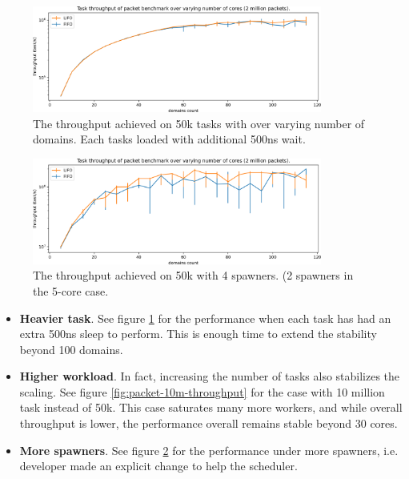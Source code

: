 \documentclass[12pt,a4paper,twoside]{report}
\begin{document}
\begin{figure} 
     \centering
     \includegraphics[width=0.85\textwidth]{eval/packet-basic-slowed_2.png}
     \caption{The throughput achieved on 50k tasks with over varying number of domains. Each tasks loaded with additional 500ns wait.}
    \label{fig:packet-slowed}
\end{figure}


\begin{figure} 
     \centering 
     \includegraphics[width=0.85\textwidth]{eval/packet-basic-4spawners-just-throughput.png}
     \caption{The throughput achieved on 50k with 4 spawners. (2 spawners in the 5-core case.}
    \label{fig:packet-4spawners}
\end{figure}

\begin{itemize}
    \item \textbf{Heavier task}. See figure \ref{fig:packet-slowed} for the performance when each task has had an extra 500ns sleep to perform. This is enough time to extend the stability beyond 100 domains.
        
    \item \textbf{Higher workload}. In fact, increasing the number of tasks also stabilizes the scaling. See figure \ref{fig:packet-10m-throughput} for the case with 10 million task instead of 50k. This case saturates many more workers, and while overall throughput is lower, the performance overall remains stable beyond 30 cores. 
    
    \item \textbf{More spawners}. See figure \ref{fig:packet-4spawners} for the performance under more spawners, i.e. developer made an explicit change to help the scheduler.
\end{itemize}
\end{document}
